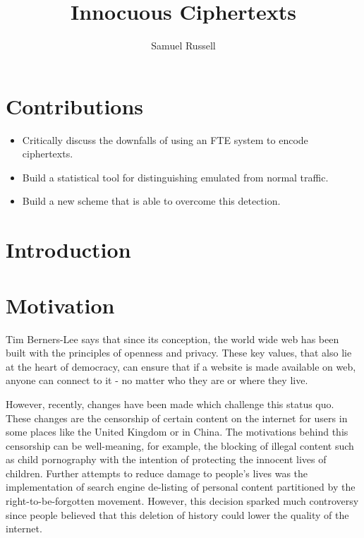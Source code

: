 \documentclass[10pt,a4paper]{article}
\author{Samuel Russell}
\title{Innocuous Ciphertexts}
\begin{document}
\maketitle

\section{Contributions}

\begin{itemize}
\item Critically discuss the downfalls of using an FTE system to encode ciphertexts.
\item Build a statistical tool for distinguishing emulated from normal traffic.
\item Build a new scheme that is able to overcome this detection.
\end{itemize}

\pagebreak
\section{Introduction}



\pagebreak
\section{Motivation}

Tim Berners-Lee says\cite{gard} that since its conception, the world wide web has been built with the principles of openness and privacy. These key values, that also lie at the heart of democracy, can ensure that if a website is made available on web, anyone can connect to it - no matter who they are or where they live. 

However, recently, changes have been made which challenge this status quo. These changes are the censorship of certain content on the internet for users in some places like the United Kingdom or in China. The motivations behind this censorship can be well-meaning, for example, the blocking of illegal content such as child pornography with the intention of protecting the innocent lives of children. Further attempts to reduce damage to people's lives was the implementation of search engine de-listing of personal content partitioned by the right-to-be-forgotten movement\cite{rtbf}. However, this decision sparked much controversy since people believed that this deletion of history could lower the quality of the internet. 
\end{document}

